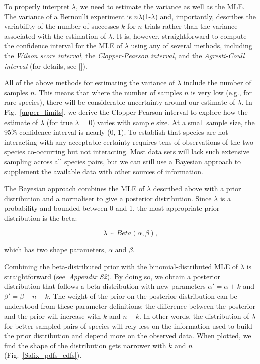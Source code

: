 \documentclass[12pt]{article}
\begin{document}
\begin{spacing}{2.0}
    To properly interpret $\lambda$, we need to estimate the variance as well as the MLE. The variance of a Bernoulli experiment is $n\lambda$(1-$\lambda$) and, importantly, describes the variability of the number of successes $k$ for $n$ trials rather than the variance associated with the estimation of $\lambda$. It is, however, straightforward to compute the confidence interval for the MLE of $\lambda$ using any of several methods, including the \emph{Wilson score interval}, the \emph{Clopper-Pearson interval}, and the \emph{Agresti-Coull interval} (for details, see [\citealp{Brown2001}]). 


    All of the above methods for estimating the variance of $\lambda$ include the number of samples $n$. This means that where the number of samples $n$ is very low (e.g., for rare species), there will be considerable uncertainty around our estimate of $\lambda$. In Fig.~\ref{upper_limits}, we derive the Clopper-Pearson interval to explore how the estimate of $\lambda$ (for true $\lambda = 0$) varies with sample size. At a small sample size, the 95\% confidence interval is nearly (0, 1). To establish that species are not interacting with any acceptable certainty requires tens of observations of the two species co-occurring but not interacting. Most data sets will lack such extensive sampling across all species pairs, but we can still use a Bayesian approach to supplement the available data with other sources of information.


    The Bayesian approach combines the MLE of $\lambda$ described above with a prior distribution and a normaliser to give a posterior distribution. Since $\lambda$ is a probability and bounded between 0 and 1, the most appropriate prior distribution is the beta: 

    \begin{equation}
          \lambda \sim Beta(\alpha,\beta) , \label{prior}
        \end{equation}

        \noindent which has two shape parameters, $\alpha$ and $\beta$. 

    Combining the beta-distributed prior with the binomial-distributed MLE of $\lambda$ is straightforward (see~\emph{Appendix S2}). By doing so, we obtain a posterior distribution that follows a beta distribution with new parameters $\alpha'= \alpha+k$ and $\beta'=\beta+n-k$. The weight of the prior on the posterior distribution can be understood from these parameter definitions: the difference between the posterior and the prior will increase with $k$ and $n-k$. In other words, the distribution of $\lambda$ for better-sampled pairs of species will rely less on the information used to build the prior distribution and depend more on the observed data. When plotted, we find the shape of the distribution gets narrower with $k$ and $n$ (Fig.~\ref{Salix_pdfs_cdfs}). 



\end{spacing}
\end{document}
